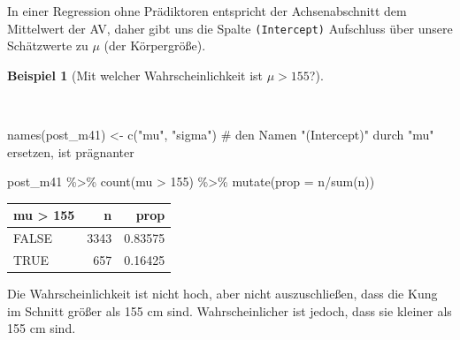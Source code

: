 \documentclass[
  a4paper,
  DIV=11]{scrreprt}
\newenvironment{Shaded}{\begin{snugshade}}{\end{snugshade}}
\newcommand{\AttributeTok}[1]{\textcolor[rgb]{0.40,0.45,0.13}{#1}}
\newcommand{\CommentTok}[1]{\textcolor[rgb]{0.37,0.37,0.37}{#1}}
\newcommand{\DecValTok}[1]{\textcolor[rgb]{0.68,0.00,0.00}{#1}}
\newcommand{\FunctionTok}[1]{\textcolor[rgb]{0.28,0.35,0.67}{#1}}
\newcommand{\NormalTok}[1]{\textcolor[rgb]{0.00,0.23,0.31}{#1}}
\newcommand{\OtherTok}[1]{\textcolor[rgb]{0.00,0.23,0.31}{#1}}
\newcommand{\SpecialCharTok}[1]{\textcolor[rgb]{0.37,0.37,0.37}{#1}}
\newcommand{\StringTok}[1]{\textcolor[rgb]{0.13,0.47,0.30}{#1}}
\theoremstyle{definition}
\newtheorem{example}{Beispiel}[chapter]
\theoremstyle{remark}
\begin{document}
In einer Regression ohne Prädiktoren entspricht der Achsenabschnitt dem
Mittelwert der AV, daher gibt uns die Spalte \texttt{(Intercept)}
Aufschluss über unsere Schätzwerte zu \(\mu\) (der Körpergröße).

\leavevmode{}%
\begin{example}[Mit welcher Wahrscheinlichkeit ist
\(\mu>155\)?]\label{exm-kung1}

~

\begin{Shaded}
\begin{Highlighting}[]

\FunctionTok{names}\NormalTok{(post\_m41) }\OtherTok{\textless{}{-}} 
  \FunctionTok{c}\NormalTok{(}\StringTok{"mu"}\NormalTok{, }\StringTok{"sigma"}\NormalTok{)  }\CommentTok{\# den Namen "(Intercept)" durch "mu" ersetzen, ist prägnanter}

\NormalTok{post\_m41 }\SpecialCharTok{\%\textgreater{}\%} 
  \FunctionTok{count}\NormalTok{(mu }\SpecialCharTok{\textgreater{}} \DecValTok{155}\NormalTok{) }\SpecialCharTok{\%\textgreater{}\%} 
  \FunctionTok{mutate}\NormalTok{(}\AttributeTok{prop =}\NormalTok{ n}\SpecialCharTok{/}\FunctionTok{sum}\NormalTok{(n))}
\end{Highlighting}
\end{Shaded}

\begin{longtable}[]{@{}lrr@{}}
\toprule()
mu \textgreater{} 155 & n & prop \\
\midrule()
\endhead
FALSE & 3343 & 0.83575 \\
TRUE & 657 & 0.16425 \\
\bottomrule()
\end{longtable}

Die Wahrscheinlichkeit ist nicht hoch, aber nicht auszuschließen, dass
die Kung im Schnitt größer als 155 cm sind. Wahrscheinlicher ist jedoch,
dass sie kleiner als 155 cm sind.

\end{example}
\end{document}
